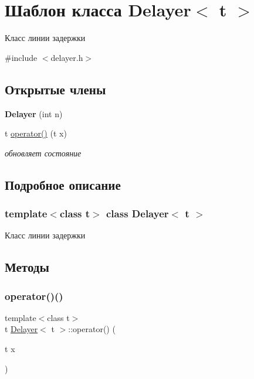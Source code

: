 \hypertarget{classDelayer}{}\section{Шаблон класса Delayer$<$ t $>$}
\label{classDelayer}


Класс линии задержки  




{\ttfamily \#include $<$delayer.\+h$>$}

\subsection*{Открытые члены}
\begin{DoxyCompactItemize}
\item 
\mbox{\label{classDelayer_a24010c6b64b225c6255f2109ba143e22}} 
{\bfseries Delayer} (int n)
\item 
t \hyperlink{classDelayer_a7aafed93e61eb191c02fa841728d63de}{operator()} (t x)
\begin{DoxyCompactList}\small\item\em обновляет состояние \end{DoxyCompactList}\end{DoxyCompactItemize}


\subsection{Подробное описание}
\subsubsection*{template$<$class t$>$\newline
class Delayer$<$ t $>$}

Класс линии задержки 

\subsection{Методы}
\mbox{\label{classDelayer_a7aafed93e61eb191c02fa841728d63de}} 
\subsubsection{\texorpdfstring{operator()()}{operator()()}}
{\footnotesize\ttfamily template$<$class t$>$ \\
t \hyperlink{classDelayer}{Delayer}$<$ t $>$\+::operator() (\begin{DoxyParamCaption}\item[{t}]{x }\end{DoxyParamCaption})\hspace{0.3cm}{\ttfamily [inline]}}




